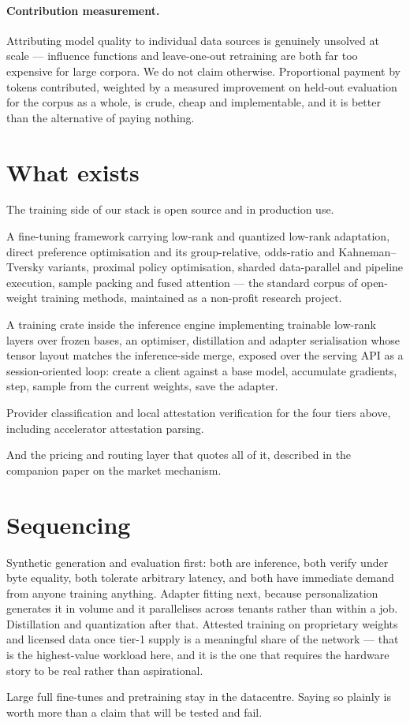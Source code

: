 \documentclass[11pt,a4paper]{article}
\begin{document}
\paragraph{Contribution measurement.} Attributing model quality to individual data
sources is genuinely unsolved at scale --- influence functions and leave-one-out
retraining are both far too expensive for large corpora. We do not claim
otherwise. Proportional payment by tokens contributed, weighted by a measured
improvement on held-out evaluation for the corpus as a whole, is crude, cheap and
implementable, and it is better than the alternative of paying nothing.

\section{What exists}

The training side of our stack is open source and in production use.

A fine-tuning framework carrying low-rank and quantized low-rank adaptation,
direct preference optimisation and its group-relative, odds-ratio and
Kahneman--Tversky variants, proximal policy optimisation, sharded data-parallel
and pipeline execution, sample packing and fused attention --- the standard corpus
of open-weight training methods, maintained as a non-profit research project.

A training crate inside the inference engine implementing trainable low-rank
layers over frozen bases, an optimiser, distillation and adapter serialisation
whose tensor layout matches the inference-side merge, exposed over the serving API
as a session-oriented loop: create a client against a base model, accumulate
gradients, step, sample from the current weights, save the adapter.

Provider classification and local attestation verification for the four tiers
above, including accelerator attestation parsing.

And the pricing and routing layer that quotes all of it, described in the
companion paper on the market mechanism.

\section{Sequencing}

Synthetic generation and evaluation first: both are inference, both verify under
byte equality, both tolerate arbitrary latency, and both have immediate demand
from anyone training anything. Adapter fitting next, because personalization
generates it in volume and it parallelises across tenants rather than within a
job. Distillation and quantization after that. Attested training on proprietary
weights and licensed data once tier-1 supply is a meaningful share of the network
--- that is the highest-value workload here, and it is the one that requires the
hardware story to be real rather than aspirational.

Large full fine-tunes and pretraining stay in the datacentre. Saying so plainly is
worth more than a claim that will be tested and fail.
\end{document}

